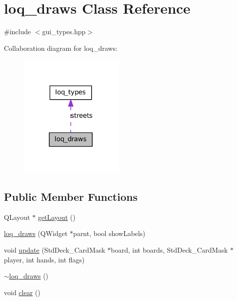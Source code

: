\hypertarget{classloq__draws}{
\section{loq\_\-draws Class Reference}
\label{classloq__draws}
}


{\ttfamily \#include $<$gui\_\-types.hpp$>$}



Collaboration diagram for loq\_\-draws:
\nopagebreak
\begin{figure}[H]
\begin{center}
\leavevmode
\includegraphics[width=147pt]{classloq__draws__coll__graph}
\end{center}
\end{figure}
\subsection*{Public Member Functions}
\begin{DoxyCompactItemize}
\item 
QLayout $\ast$ \hyperlink{classloq__draws_adf710b577a5ba1c42fbbbf9f627d93cd}{getLayout} ()
\item 
\hyperlink{classloq__draws_ac1b7ea35073181c511a52339f7f6ff07}{loq\_\-draws} (QWidget $\ast$parnt, bool showLabels)
\item 
void \hyperlink{classloq__draws_a0004984ee3c6ae30ff3e2135f4a6fcfb}{update} (StdDeck\_\-CardMask $\ast$board, int boards, StdDeck\_\-CardMask $\ast$player, int hands, int flags)
\item 
\hyperlink{classloq__draws_af7af61cc3cc2201e46be34b99ddf58b9}{$\sim$loq\_\-draws} ()
\item 
void \hyperlink{classloq__draws_aa8ae7a4f809aacde8c16d526ea3383b2}{clear} ()
\end{DoxyCompactItemize}


